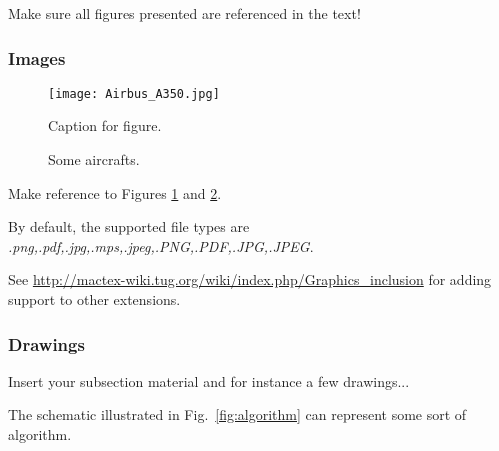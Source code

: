 Make sure all figures presented are referenced in the text!


\subsubsection{Images}
\label{subsection:images}

\begin{figure}[!htb]
  \centering
  \texttt{[image: Airbus\_A350.jpg]}
  \caption[Caption for figure in TOC.]{Caption for figure.}
  \label{fig:airbus1}
\end{figure}

\begin{figure}[!htb]
  \begin{subfigmatrix}{2}
  \end{subfigmatrix}
  \caption{Some aircrafts.}
  \label{fig:aircrafts}
\end{figure}

Make reference to Figures \ref{fig:airbus1} and \ref{fig:aircrafts}.

By default, the supported file types are {\it .png,.pdf,.jpg,.mps,.jpeg,.PNG,.PDF,.JPG,.JPEG}.

See \url{http://mactex-wiki.tug.org/wiki/index.php/Graphics_inclusion} for adding support to other extensions.


\subsubsection{Drawings}
\label{subsection:drawings}

Insert your subsection material and for instance a few drawings...

The schematic illustrated in Fig.~\ref{fig:algorithm} can represent some sort of algorithm.

